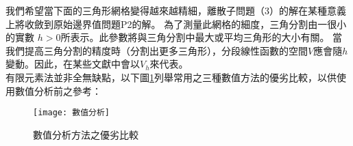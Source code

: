 \begin{itemize}
我們希望當下面的三角形網格變得越來越精細，離散子問題（3）的解在某種意義上將收斂到原始邊界值問題P2的解。 為了測量此網格的細度，三角分割由一很小的實數 $ {\displaystyle h>0}$所表示。此參數將與三角分割中最大或平均三角形的大小有關。 當我們提高三角分割的精度時（分割出更多三角形），分段線性函數的空間$ V$應會隨$ h$變動。因此，在某些文獻中會以$V_{h}$來代表。 \\

有限元素法並非全無缺點，以下圖\ref{2.90}列舉常用之三種數值方法的優劣比較，以供使用數值分析前之參考：\\
\begin{figure}[hbt!]
\begin{center}
\texttt{[image: 數值分析]}
\caption{\Large 數值分析方法之優劣比較}\label{2.90}
\end{center}
\end{figure}
\\
\end{itemize}
\newpage